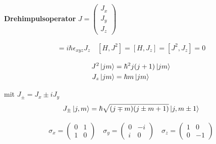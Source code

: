 




{\Huge

\textbf{Drehimpulsoperator} \( J = \begin{pmatrix} J_x\\J_y\\J_z\end{pmatrix} \)

\begin{align*}
[J_x,J_y]=i\hbar\epsilon_{xyz}J_z\quad [H,J^2] = [H,J_z] = [J^2,J_z] = 0
\end{align*}




\begin{align*}
  J^2\left| jm \right\rangle &= \hbar^2j(j+1)\left| jm \right\rangle\\
  J_z\left| jm \right\rangle &= \hbar m\left| jm \right\rangle
\end{align*}

mit \(J_\pm = J_x \pm iJ_y\)
\begin{align*}
   J_{\pm}\left| j,m \right\rangle=\hbar\sqrt{(j\mp m)(j\pm m+1)}\left| j,m\pm 1 \right\rangle
\end{align*}

\begin{align*}
  \sigma_x = \begin{pmatrix} 0&1\\1&0 \end{pmatrix}\quad   \sigma_y = \begin{pmatrix} 0&-i\\i&0 \end{pmatrix} \quad   \sigma_z = \begin{pmatrix} 1&0\\0&-1 \end{pmatrix}
\end{align*}

}%

